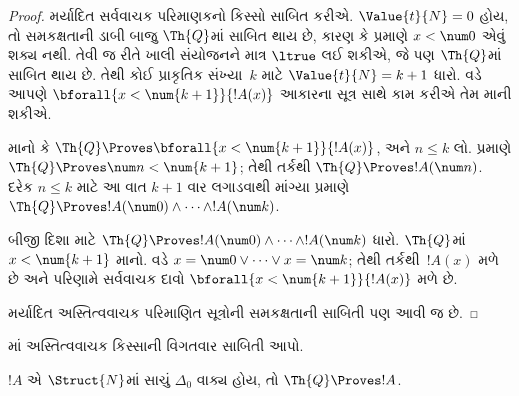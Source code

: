 \begin{proof}
    મર્યાદિત સર્વવાચક પરિમાણકનો
    કિસ્સો સાબિત કરીએ.
    $\Value{t}{N} = 0$ હોય,
    તો સમકક્ષતાની ડાબી બાજુ
    $\Th{Q}$માં સાબિત થાય છે,
    કારણ કે 
    પ્રમાણે $x<\num 0$
    એવું શક્ય નથી.
    તેવી જ રીતે ખાલી સંયોજનને
    માત્ર $\ltrue$ લઈ શકીએ,
    જે પણ $\Th{Q}$માં
    સાબિત થાય છે.
    તેથી કોઈ પ્રાકૃતિક સંખ્યા~$k$
    માટે $\Value{t}{N} = k+1$
    ધારો. 
    વડે આપણે
    $\bforall{x<\num{k+1}}{!A(x)}$
    આકારના સૂત્ર સાથે
    કામ કરીએ તેમ માની શકીએ.
    
    માનો કે $\Th{Q} \Proves
    \bforall{x<\num{k+1}}{!A(x)}$,
    અને $n \leq k$ લો.
    પ્રમાણે $\Th{Q} \Proves
    \num n < \num{k+1}$;
    તેથી તર્કથી $\Th{Q} \Proves
    !A(\num n)$. દરેક
    $n \leq k$ માટે આ વાત
    $k+1$ વાર લગાડવાથી
    માંગ્યા પ્રમાણે
    $\Th{Q} \Proves !A(\num 0)
    \land \dots \land !A(\num k)$.
    
    બીજી દિશા માટે
    $\Th{Q} \Proves
    !A(\num 0) \land \dots \land !A(\num k)$
    ધારો. $\Th{Q}$માં
    $x < \num{k+1}$ માનો.
    વડે
    $x = \num 0 \lor \dots \lor x = \num k$;
    તેથી તર્કથી~$!A(x)$
    મળે છે અને પરિણામે
    સર્વવાચક દાવો
    $\bforall{x<\num{k+1}}{!A(x)}$
    મળે છે.
    
    મર્યાદિત અસ્તિત્વવાચક
    પરિમાણિત સૂત્રોની
    સમકક્ષતાની સાબિતી પણ આવી જ છે.
\end{proof}

\begin{prob}
માં
અસ્તિત્વવાચક કિસ્સાની વિગતવાર
સાબિતી આપો.
\end{prob}

\begin{lem}
$!A$ એ $\Struct{N}$માં સાચું
$\Delta_0$ વાક્ય હોય,
તો $\Th{Q} \Proves !A$.
\end{lem}


